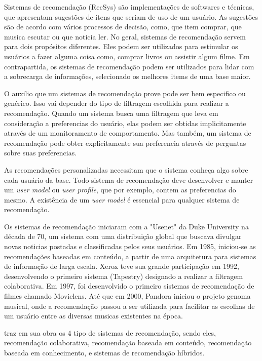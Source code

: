 \documentclass{article}
\begin{document}
Sistemas de recomendação (RecSys) são implementações de softwares e técnicas, que apresentam sugestões de itens que seriam de uso de um usuário. As sugestões são de acordo com vários processos de decisão, como, que item comprar, que musica escutar ou que noticia ler. No geral, sistemas de recomendação servem para dois propósitos diferentes. Eles podem ser utilizados para estimular os usuários a fazer alguma coisa como, comprar livros ou assistir algum filme. Em contrapartida, os sistemas de recomendação podem ser utilizados para lidar com a sobrecarga de informações, selecionado os melhores items de uma base maior. \cite{jannach2010recommender}

O auxilio que um sistemas de recomendação prove pode ser bem especifico ou genérico. Isso vai depender do tipo de filtragem escolhida para realizar a recomendação. Quando um sistema busca uma filtragem que leva em consideração a preferencias do usuário, elas podem ser obtidas implicitamente através de um monitoramento de comportamento. Mas também, um sistema de recomendação pode obter explicitamente sua preferencia através de perguntas sobre suas preferencias.
\cite{jannach2010recommender}

As recomendações personalizadas necessitam que o sistema conheça algo sobre cada usuário da base.
Todo sistema de recomendação deve desenvolver e manter um \textit{user model} ou \textit{user profile}, que por exemplo, contem as preferencias do mesmo.
A existência de um \textit{user model} é essencial para qualquer sistema de recomendação. \cite{jannach2010recommender}

Os sistemas de recomendação iniciaram com a "Usenet" da Duke University na década de 70, um sistema com uma distribuição global que buscava divulgar novas noticias postadas e classificadas pelos seus usuários. Em 1985, iniciou-se as recomendações baseadas em conteúdo, a partir de uma arquitetura para sistemas de informação de larga escala. Xerox teve sua grande participação em 1992, desenvolvendo o primeiro sistema (Tapestry) designado a realizar a filtragem colaborativa. Em 1997, foi desenvolvido o primeiro sistemas de recomendação de filmes chamado Movielens. Até que em 2000, Pandora iniciou o projeto genoma musical, onde a recomendação passou a ser utilizada para facilitar as escolhas de um usuário entre as diversas musicas existentes na época. \cite{bhatnagar2016collaborative}

\cite{jannach2010recommender} traz em sua obra os 4 tipo de sistemas de recomendação, sendo eles, recomendação colaborativa, recomendação baseada em conteúdo, recomendação baseada em conhecimento, e sistemas de recomendação híbridos.
\end{document}
